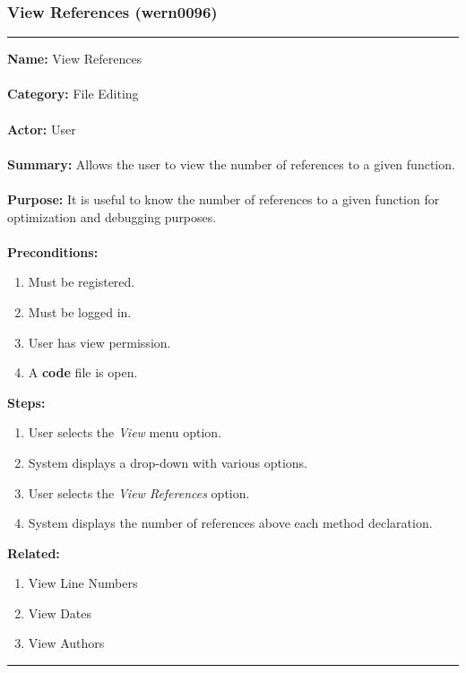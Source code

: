 \documentclass[11pt]{report}
\begin{document}
\newpage

\subsubsection{View References (wern0096)}
\vspace{2pt}
\hrule
\vspace{8pt}
	\noindent\textbf{Name:} View References \\ \\
	\textbf{Category:} File Editing \\ \\
	\textbf{Actor:} User \\ \\
	\textbf{Summary:} Allows the user to view the number of references to a given function. \\ \\
	\textbf{Purpose:} It is useful to know the number of references to a given function for optimization and debugging purposes. \\ \\
	\textbf{Preconditions:} 
	\begin{enumerate}
		\item Must be registered.
		\item Must be logged in.
		\item User has view permission.
		\item A \textbf{code} file is open.
	\end{enumerate}
	\textbf{Steps:}
	\begin{enumerate}
		\item User selects the \textit{View} menu option.
		\item System displays a drop-down with various options.
		\item User selects the \textit{View References} option.
		\item System displays the number of references above each method declaration.
	\end{enumerate}
	\textbf{Related:}
	\begin{enumerate}
		\item View Line Numbers
		\item View Dates
		\item View Authors
	\end{enumerate}
\hrule
\vspace{8pt}

\newpage
\end{document}
